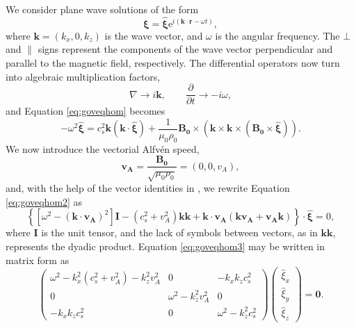 We consider plane wave solutions of the form
%
\begin{equation}
\label{eq:xiplane}
\bm \xi = \bm{\hat \xi} \mathrm{e}^{i (\mathbf{k} \cdot \mathbf{r} - \omega t)},
\end{equation}
%
where $\mathbf{k} = (k_x, 0, k_z)$ is the wave vector, and $\omega$ is the angular frequency.
The $\bot$ and $\parallel$ signs represent the components of the wave vector perpendicular and parallel to the magnetic field, respectively.
The differential operators now turn into algebraic multiplication factors,
%
\begin{equation}
\nabla \to i \mathbf{k}, \qquad \frac{\partial}{\partial t} \to - i \omega,
\end{equation}
%
and Equation \eqref{eq:goveqhom} becomes
%
\begin{equation}
\label{eq:goveqhom2}
- \omega^2 \bm{\hat \xi}
= c_s^2 \mathbf{k} (\mathbf{k} \cdot \bm{\hat \xi})
+ \frac{1}{\mu_0 \rho_0} \mathbf{B_0} \times ( \mathbf{k} \times \mathbf{k} \times (\mathbf{B_0} \times \bm{\hat \xi} )).
\end{equation}
%
We now introduce the vectorial Alfv\'en speed,
%
\begin{equation}
\label{eq:valfven}
\mathbf{v_A} = \frac{\mathbf{B_0}}{\sqrt{\mu_0 \rho_0}}
= (0, 0, v_A),
\end{equation}
%
and, with the help of the vector identities in \cite{Goedbloed2004}, we rewrite Equation \eqref{eq:goveqhom2} as
%
\begin{equation}
\label{eq:goveqhom3}
\left\{
\left[ \omega^2 - (\mathbf{k} \cdot \mathbf{v_A})^2 \right] \mathbf{I}
- (c_s^2 + v_A^2) \mathbf{k} \mathbf{k}
+ \mathbf{k} \cdot \mathbf{v_A} (\mathbf{k} \mathbf{v_A} + \mathbf{v_A} \mathbf{k})
\right\}
\cdot \bm{\hat \xi} = 0,
\end{equation}
%
where $\mathbf{I}$ is the unit tensor, and the lack of symbols between vectors, as in $\mathbf{k}\mathbf{k}$, represents the dyadic product.
Equation \eqref{eq:goveqhom3} may be written in matrix form as
%
\begin{equation}
\label{eq:goveqhom4}
\begin{pmatrix}
\omega^2 - k_x^2 (c_s^2 + v_A^2) - k_z^2 v_A^2 & 0 & - k_x k_z c_s^2
\\
0 & \omega^2 - k_z^2 v_A^2 & 0
\\
- k_x k_z c_s^2 & 0 & \omega^2 - k_z^2 c_s^2
\end{pmatrix}
\begin{pmatrix}
\hat \xi_x
\\
\hat \xi_y
\\
\hat \xi_z
\end{pmatrix}
=
\mathbf{0}.
\end{equation}
